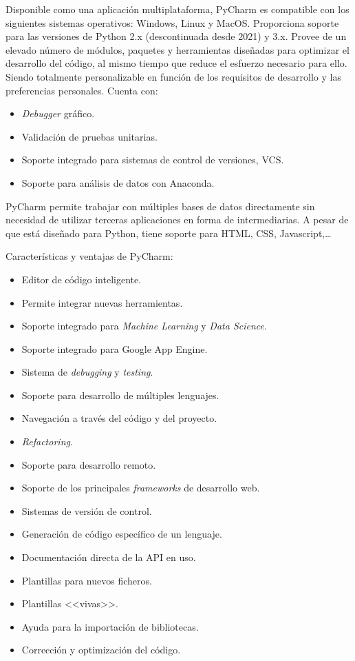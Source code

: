 Disponible como una aplicación multiplataforma, PyCharm es compatible con los siguientes sistemas operativos: Windows, Linux y MacOS. Proporciona soporte para las versiones de Python 2.x (descontinuada desde 2021) y 3.x. Provee de un elevado número de módulos, paquetes y herramientas diseñadas para optimizar el desarrollo del código, al mismo tiempo que reduce el esfuerzo necesario para ello. Siendo totalmente personalizable en función de los requisitos de desarrollo y las preferencias personales. Cuenta con:
\begin{itemize}
\item \textit{Debugger} gráfico.
\item Validación de pruebas unitarias.
\item Soporte integrado para sistemas de control de versiones, VCS.
\item Soporte para análisis de datos con Anaconda.
\end{itemize}
PyCharm permite trabajar con múltiples bases de datos directamente sin necesidad de utilizar terceras aplicaciones en forma de intermediarias. A pesar de que está diseñado para Python, tiene soporte para HTML, CSS, Javascript,\dots

Características y ventajas de PyCharm:
\begin{itemize}
\item Editor de código inteligente. 
\item Permite integrar nuevas herramientas.
\item Soporte integrado para \textit{Machine Learning} y \textit{Data Science}.
\item Soporte integrado para Google App Engine.
\item Sistema de \textit{debugging} y \textit{testing}.
\item Soporte para desarrollo de múltiples lenguajes.
\item Navegación a través del código y del proyecto.
\item \textit{Refactoring}.
\item Soporte para desarrollo remoto.
\item Soporte de los principales \textit{frameworks} de desarrollo web.
\item Sistemas de versión de control.
\item Generación de código específico de un lenguaje.
\item Documentación directa de la API en uso.
\item Plantillas para nuevos ficheros.
\item Plantillas <<vivas>>.
\item Ayuda para la importación de bibliotecas.
\item Corrección y optimización del código.
\end{itemize}

